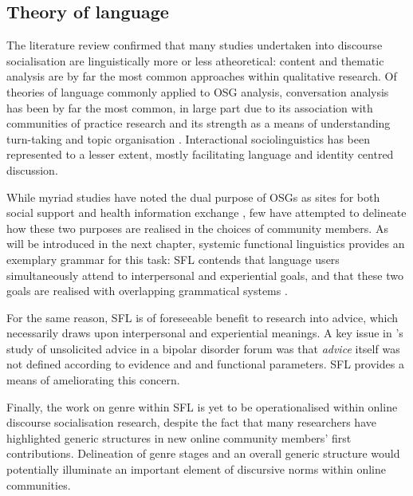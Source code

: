 	  \subsection{Theory of language}

		 The literature review confirmed that many studies undertaken into discourse socialisation are linguistically more or less atheoretical: content and thematic analysis are by far the most common approaches within qualitative research. Of theories of language commonly applied to OSG analysis, conversation analysis has been by far the most common, in large part due to its association with communities of practice research and its strength as a means of understanding turn-taking and topic organisation \cite{stommel_conversation_2008}. Interactional sociolinguistics \cite{hymes_communicative_1972} has been represented to a lesser extent, mostly facilitating language and identity centred discussion.

		 While myriad studies have noted the dual purpose of OSGs as sites for both social support and health information exchange \cite{attard_thematic_2012}, few have attempted to delineate how these two purposes are realised in the  choices of community members. As will be introduced in the next chapter, systemic functional linguistics provides an exemplary grammar for this task: SFL contends that language users simultaneously attend to interpersonal and experiential goals, and that these two goals are realised with overlapping grammatical systems \cite{halliday_introduction:_2004}. 

		 For the same reason, SFL is of foreseeable benefit to research into advice, which necessarily draws upon interpersonal and experiential meanings. A key issue in 's study of unsolicited advice in a bipolar disorder forum was that \emph{advice} itself was not defined according to  evidence and and functional parameters. SFL provides a means of ameliorating this concern.

		 Finally, the work on genre within SFL \cite[e.g.][]{eggins_analysing_2004} is yet to be operationalised within online discourse socialisation research, despite the fact that many researchers have highlighted generic structures in new online community members' first contributions. Delineation of genre stages and an overall generic structure would potentially illuminate an important element of discursive norms within online communities.


